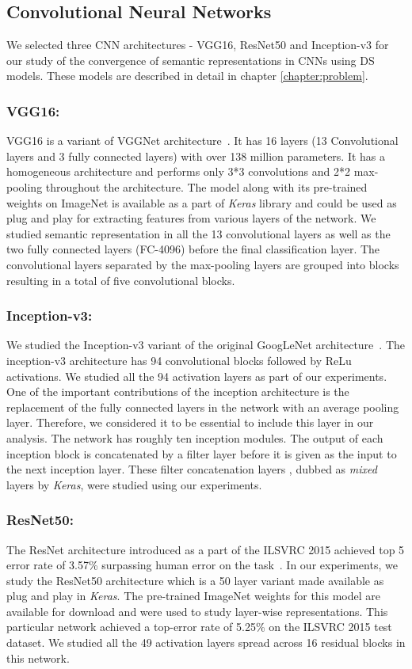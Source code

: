 \subsection{Convolutional Neural Networks}
We selected three CNN architectures - VGG16, ResNet50 and Inception-v3 for our study of the convergence of semantic representations in CNNs using DS models. These models are described in detail in chapter \ref{chapter:problem}.

\subsubsection{VGG16:} VGG16 is a variant of VGGNet architecture~\cite{VGG16}. It has 16 layers (13 Convolutional layers and 3 fully connected layers) with over 138 million parameters. It has a homogeneous architecture and performs only 3*3 convolutions and 2*2 max-pooling throughout the architecture. The model along with its pre-trained weights on ImageNet is available as a part of \textit{Keras} library and could be used as plug and play for extracting features from various layers of the network. We studied semantic representation in all the 13 convolutional layers as well as the two fully connected layers (FC-4096) before the final classification layer. The convolutional layers separated by the max-pooling layers are grouped into blocks resulting in a total of five convolutional blocks.

\subsubsection{Inception-v3:}

We studied the Inception-v3 variant of the original GoogLeNet architecture~\cite{Inception-v3}. The inception-v3 architecture has 94 convolutional blocks followed by ReLu activations. We studied all the 94 activation layers as part of our experiments. One of the important contributions of the inception architecture is the replacement of the fully connected layers in the network with an average pooling layer. Therefore, we considered it to be essential to include this layer in our analysis. The network has roughly ten inception modules. The output of each inception block is concatenated by a filter layer before it is given as the input to the next inception layer. These filter concatenation layers , dubbed as \textit{mixed} layers by \textit{Keras}, were studied using our experiments.

\subsubsection{ResNet50:} 
The ResNet architecture introduced as a part of the ILSVRC 2015 achieved top 5 error rate of  3.57\% surpassing human error on the task~\cite{ResNet}. In our experiments, we study the ResNet50 architecture which is a 50 layer variant made available as plug and play in \textit{Keras}. The pre-trained ImageNet weights for this model are available for download and were used to study layer-wise representations. This particular network achieved a top-error rate of 5.25\% on the ILSVRC 2015 test dataset. We studied all the 49 activation layers spread across 16 residual blocks in this network.

